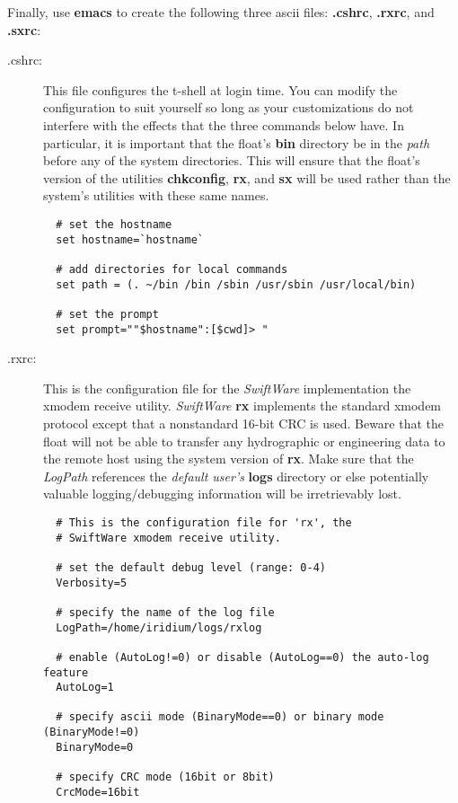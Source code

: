 Finally, use \textbf{emacs} to create the following three ascii files:
\textbf{.cshrc}, \textbf{.rxrc}, and \textbf{.sxrc}:
\begin{description}
\item[.cshrc:] This file configures the t-shell at login time.  You can
  modify the configuration to suit yourself so long as your customizations
  do not interfere with the effects that the three commands below have.  In
  particular, it is important that the float's \textbf{bin} directory be in
  the {\sl path\/} before any of the system directories.  This will ensure
  that the float's version of the utilities \textbf{chkconfig}, \textbf{rx},
  and \textbf{sx} will be used rather than the system's utilities with these
  same names.
  
  \begin{verbatim}
  # set the hostname
  set hostname=`hostname`
  
  # add directories for local commands
  set path = (. ~/bin /bin /sbin /usr/sbin /usr/local/bin)
  
  # set the prompt
  set prompt=""$hostname":[$cwd]> "
  \end{verbatim}
  
\item[.rxrc:] This is the configuration file for the \emph{SwiftWare}\/
  implementation the xmodem receive utility.  \emph{SwiftWare}\/ \textbf{rx}
  implements the standard xmodem protocol except that a nonstandard 16-bit
  CRC is used.  Beware that the float will not be able to transfer any
  hydrographic or engineering data to the remote host using the system
  version of \textbf{rx}.  Make sure that the {\sl LogPath}\/ references the
  \emph{default user's}\/ \textbf{logs} directory or else potentially
  valuable logging/debugging information will be irretrievably lost.

  \begin{verbatim}
  # This is the configuration file for 'rx', the 
  # SwiftWare xmodem receive utility.
  
  # set the default debug level (range: 0-4)
  Verbosity=5
  
  # specify the name of the log file
  LogPath=/home/iridium/logs/rxlog
  
  # enable (AutoLog!=0) or disable (AutoLog==0) the auto-log feature
  AutoLog=1
  
  # specify ascii mode (BinaryMode==0) or binary mode (BinaryMode!=0) 
  BinaryMode=0
  
  # specify CRC mode (16bit or 8bit)
  CrcMode=16bit
  \end{verbatim}
 

\end{description}
